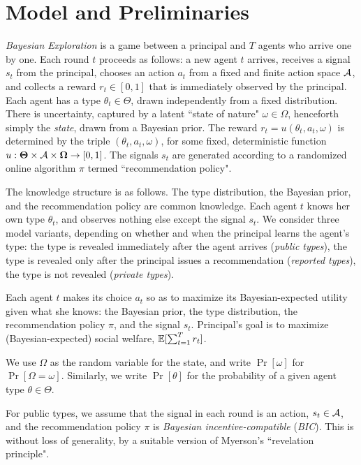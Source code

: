 \section{Model and Preliminaries}

\emph{Bayesian Exploration} is a game between a principal and $T$ agents who arrive one by one. Each round $t$ proceeds as follows: a new agent $t$ arrives, receives a signal $s_t$ from the principal, chooses an action $a_t$ from a fixed and finite action space $\mathcal{A}$, and collects a reward $r_t\in [0,1]$ that is immediately observed by the principal. Each agent has a type $\theta_t\in\varTheta$, drawn independently from a fixed distribution. There is uncertainty, captured by a latent ``state of nature" $\omega\in \varOmega$, henceforth simply the \emph{state}, drawn from a Bayesian prior. The reward $r_t = u(\theta_t,a_t,\omega)$ is determined by the triple $(\theta_t,a_t,\omega)$, for some fixed, deterministic function
    $u:\bold{\Theta}\times \mathcal{A} \times \bold{\Omega} \to [0,1]$.
The signals $s_t$ are generated according to a randomized online algorithm $\pi$ termed ``recommendation policy".

The knowledge structure is as follows. The type distribution, the Bayesian prior, and the recommendation policy are common knowledge. Each agent $t$ knows her own type $\theta_t$, and observes nothing else except the signal $s_t$.  We consider three model variants, depending on whether and when the principal learns the agent's type: the type is revealed immediately after the agent arrives (\emph{public types}), the type is revealed only after the principal issues a recommendation (\emph{reported types}), the type is not revealed (\emph{private types}).


Each agent $t$ makes its choice $a_t$ so as to maximize its Bayesian-expected utility given what she knows: the Bayesian prior, the type distribution, the recommendation policy $\pi$, and the signal $s_t$. Principal's goal is to maximize (Bayesian-expected) social welfare, \ie $\mathbb{E}[\sum_{t=1}^T r_t]$.

We use $\Omega$ as the random variable for the state, and write $\Pr[\omega]$ for $\Pr[\Omega=\omega]$. Similarly, we write $\Pr[\theta]$ for the probability of a given agent type $\theta\in \varTheta$.

For public types, we assume that the signal in each round is an action, \ie $s_t \in \mathcal{A}$, and the recommendation policy $\pi$ is {\em Bayesian incentive-compatible} (\emph{BIC}). This is without loss of generality, by a suitable version of Myerson's ``revelation principle".

